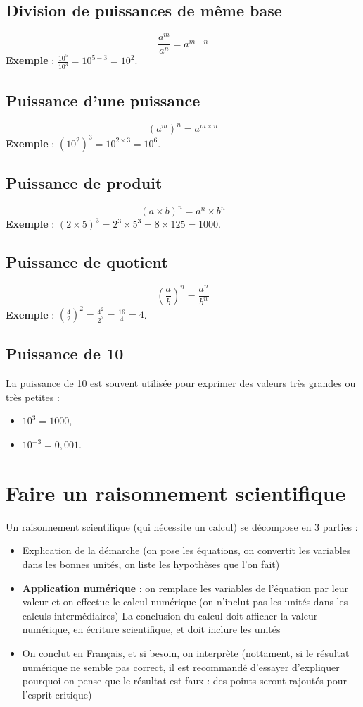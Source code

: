 \documentclass[a4paper,12pt]{article}
\begin{document}
\subsection{Division de puissances de même base}
\[
\frac{a^m}{a^n} = a^{m - n}
\]
\textbf{Exemple} : \( \frac{10^5}{10^3} = 10^{5-3} = 10^2 \).

\subsection{Puissance d'une puissance}
\[
(a^m)^n = a^{m \times n}
\]
\textbf{Exemple} : \( (10^2)^3 = 10^{2 \times 3} = 10^6 \).

\subsection{Puissance de produit}
\[
(a \times b)^n = a^n \times b^n
\]
\textbf{Exemple} : \( (2 \times 5)^3 = 2^3 \times 5^3 = 8 \times 125 = 1000 \).

\subsection{Puissance de quotient}
\[
\left(\frac{a}{b}\right)^n = \frac{a^n}{b^n}
\]
\textbf{Exemple} : \( \left(\frac{4}{2}\right)^2 = \frac{4^2}{2^2} = \frac{16}{4} = 4 \).

\subsection{Puissance de 10}
La puissance de 10 est souvent utilisée pour exprimer des valeurs très grandes ou très petites :
\begin{itemize}[noitemsep]
    \item \( 10^3 = 1000 \),
    \item \( 10^{-3} = 0,001 \).
\end{itemize}

\section{Faire un raisonnement scientifique}

Un raisonnement scientifique (qui nécessite un calcul) se décompose en 3 parties :
\begin{itemize}[noitemsep]
  \item Explication de la démarche (on pose les équations, on convertit les variables dans les bonnes unités, on liste les hypothèses que l'on fait)
  \item \textbf{Application numérique} : on remplace les variables de l'équation par leur valeur et on effectue le calcul numérique (on n'inclut pas les unités dans les calculs intermédiaires) La conclusion du calcul doit afficher la valeur numérique, en écriture scientifique, et doit inclure les unités
  \item On conclut en Français, et si besoin, on interprète (nottament, si le résultat numérique ne semble pas correct, il est recommandé d'essayer d'expliquer pourquoi on pense que le résultat est faux : des points seront rajoutés pour l'esprit critique)
\end{itemize}
\end{document}
